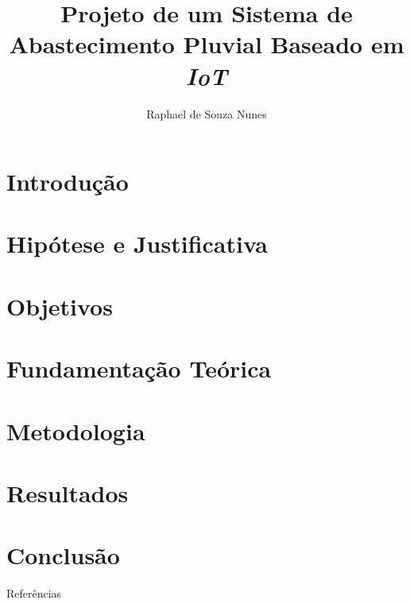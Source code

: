\documentclass[11pt]{beamer}
\title[Trabalho de Conclusão de Curso]{Projeto de um Sistema de Abastecimento Pluvial Baseado em \textit{IoT}}
\author[Nunes, de S. R.]{Raphael de Souza Nunes}
\begin{document}


\section{Introdução} 


\section{Hipótese e Justificativa}


\section{Objetivos}


\section{Fundamentação Teórica}


\section{Metodologia}


\section{Resultados}


\section{Conclusão}




\nocite{*}
\begin{frame}[allowframebreaks]{Referências}


\end{frame}


\begin{frame}
\titlepage 
\end{frame}
\end{document}
